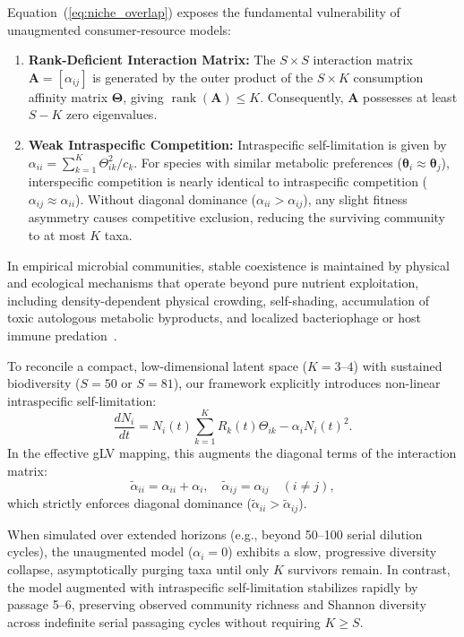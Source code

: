 Equation~(\ref{eq:niche_overlap}) exposes the fundamental vulnerability of unaugmented consumer-resource models:
\begin{enumerate}
    \item \textbf{Rank-Deficient Interaction Matrix:} The $S \times S$ interaction matrix $\mathbf{A} = [\alpha_{ij}]$ is generated by the outer product of the $S \times K$ consumption affinity matrix $\mathbf{\Theta}$, giving $\operatorname{rank}(\mathbf{A}) \le K$. Consequently, $\mathbf{A}$ possesses at least $S - K$ zero eigenvalues.
    \item \textbf{Weak Intraspecific Competition:} Intraspecific self-limitation is given by $\alpha_{ii} = \sum_{k=1}^K \Theta_{ik}^2 / c_k$. For species with similar metabolic preferences ($\mathbf{\theta}_i \approx \mathbf{\theta}_j$), interspecific competition is nearly identical to intraspecific competition ($\alpha_{ij} \approx \alpha_{ii}$). Without diagonal dominance ($\alpha_{ii} > \alpha_{ij}$), any slight fitness asymmetry causes competitive exclusion, reducing the surviving community to at most $K$ taxa.
\end{enumerate}

In empirical microbial communities, stable coexistence is maintained by physical and ecological mechanisms that operate beyond pure nutrient exploitation, including density-dependent physical crowding, self-shading, accumulation of toxic autologous metabolic byproducts, and localized bacteriophage or host immune predation~\cite{barbier2020generic}. 

To reconcile a compact, low-dimensional latent space ($K=3\text{--}4$) with sustained biodiversity ($S=50$ or $S=81$), our framework explicitly introduces non-linear intraspecific self-limitation:
\begin{equation}
\frac{dN_i}{dt} = N_i(t) \sum_{k=1}^K R_k(t) \Theta_{ik} - \alpha_i N_i(t)^2.
\end{equation}
In the effective gLV mapping, this augments the diagonal terms of the interaction matrix:
\begin{equation}
\tilde{\alpha}_{ii} = \alpha_{ii} + \alpha_i, \quad \tilde{\alpha}_{ij} = \alpha_{ij} \quad (i \ne j),
\end{equation}
which strictly enforces diagonal dominance ($\tilde{\alpha}_{ii} > \tilde{\alpha}_{ij}$). 

When simulated over extended horizons (e.g., beyond 50--100 serial dilution cycles), the unaugmented model ($\alpha_i = 0$) exhibits a slow, progressive diversity collapse, asymptotically purging taxa until only $K$ survivors remain. In contrast, the model augmented with intraspecific self-limitation stabilizes rapidly by passage 5--6, preserving observed community richness and Shannon diversity across indefinite serial passaging cycles without requiring $K \ge S$.